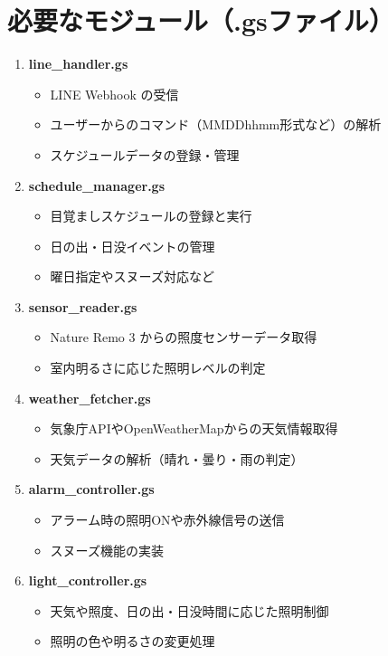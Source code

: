 \documentclass{jarticle}
\begin{document}
\section*{必要なモジュール（.gsファイル）}

\begin{enumerate}
  \item \textbf{line\_handler.gs}
  \begin{itemize}
    \item LINE Webhook の受信
    \item ユーザーからのコマンド（MMDDhhmm形式など）の解析
    \item スケジュールデータの登録・管理
  \end{itemize}

  \item \textbf{schedule\_manager.gs}
  \begin{itemize}
    \item 目覚ましスケジュールの登録と実行
    \item 日の出・日没イベントの管理
    \item 曜日指定やスヌーズ対応など
  \end{itemize}

  \item \textbf{sensor\_reader.gs}
  \begin{itemize}
    \item Nature Remo 3 からの照度センサーデータ取得
    \item 室内明るさに応じた照明レベルの判定
  \end{itemize}

  \item \textbf{weather\_fetcher.gs}
  \begin{itemize}
    \item 気象庁APIやOpenWeatherMapからの天気情報取得
    \item 天気データの解析（晴れ・曇り・雨の判定）
  \end{itemize}

  \item \textbf{alarm\_controller.gs}
  \begin{itemize}
    \item アラーム時の照明ONや赤外線信号の送信
    \item スヌーズ機能の実装
  \end{itemize}

  \item \textbf{light\_controller.gs}
  \begin{itemize}
    \item 天気や照度、日の出・日没時間に応じた照明制御
    \item 照明の色や明るさの変更処理
  \end{itemize}
\end{enumerate}
\end{document}
